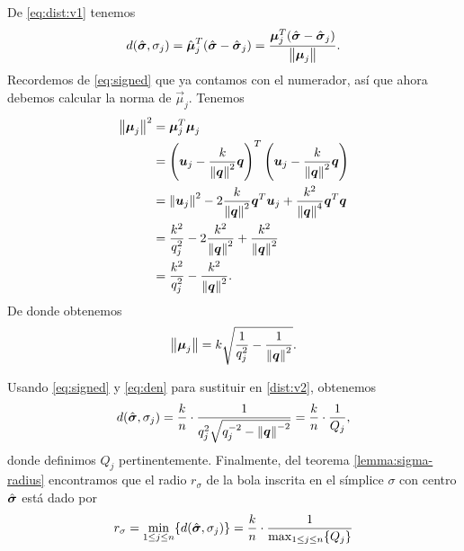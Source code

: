 De \eqref{eq:dist:v1} tenemos
\begin{equation}
	\label{dist:v2}
	d(\hat{\boldsymbol{ \sigma }}, \sigma_j) = \hat{\boldsymbol{\mu}}_j^T(\hat{\boldsymbol{ \sigma }} - \hat{\boldsymbol{ \sigma }}_j)
	= \frac{\boldsymbol{\mu}_j^T(\hat{\boldsymbol{ \sigma }} - \hat{\boldsymbol{ \sigma }}_j)}{\left\lVert \boldsymbol{\mu}_j \right\rVert}.
\end{equation}
Recordemos de \eqref{eq:signed} que ya contamos con el numerador, así que ahora debemos calcular la
norma de $\vec{\mu}_j$. Tenemos
\begin{align*}
	\left\lVert \boldsymbol{\mu}_j \right\rVert^2
	&= \boldsymbol{\mu}_j^T\boldsymbol{\mu}_j \\
	&=
	\left(\boldsymbol{u}_j - \frac{k}{\left\lVert \boldsymbol{q} \right\rVert^2}\boldsymbol{q}\right)^T
	\left(\boldsymbol{u}_j - \frac{k}{\left\lVert \boldsymbol{q} \right\rVert^2}\boldsymbol{q}\right) \\
	&=
	\left\lVert \boldsymbol{u}_j \right\rVert^2 - 2\frac{k}{\left\lVert \boldsymbol{q} \right\rVert^2}\boldsymbol{q}^T\boldsymbol{u}_j +
	\frac{k^2}{\left\lVert \boldsymbol{q} \right\rVert^4}\boldsymbol{q}^T\boldsymbol{q} \\
	&= \frac{k^2}{q_j^2} - 2\frac{k^2}{\left\lVert \boldsymbol{q} \right\rVert^2} + \frac{k^2}{\left\lVert \boldsymbol{q} \right\rVert^2} \\
	&= \frac{k^2}{q_j^2} - \frac{k^2}{\left\lVert \boldsymbol{q} \right\rVert^2}.
\end{align*}
De donde obtenemos
\begin{equation}
	\label{eq:den}
	\left\lVert \boldsymbol{\mu}_j \right\rVert = k\sqrt{\frac{1}{q_j^2} - \frac{1}{\left\lVert \boldsymbol{q} \right\rVert^2}}.
\end{equation}

Usando \eqref{eq:signed} y \eqref{eq:den} para sustituir en \eqref{dist:v2}, obtenemos
\begin{equation*}
	d(\hat{\boldsymbol{ \sigma }}, \sigma_j) = \frac{k}{n} \cdot
	\frac{1}{q_j^2\sqrt{q_j^{-2} - \left\lVert \boldsymbol{q} \right\rVert^{-2}}}
	= \frac{k}{n} \cdot \frac{1}{Q_j},
\end{equation*}
donde definimos $Q_j$ pertinentemente. Finalmente, del teorema \ref{lemma:sigma-radius} encontramos que
el radio $r_\sigma$ de la bola inscrita en el símplice $\sigma$ con centro
$\hat{\boldsymbol{ \sigma }}$ está dado por
\begin{equation}
	\label{eq:sigma-radius}
	r_\sigma = \min_{1 \leq j \leq n} \lbrace d(\hat{\boldsymbol{ \sigma }}, \sigma_j) \rbrace = \frac{k}{n} \cdot
	\frac{1}{\max_{1 \leq j \leq n} \lbrace Q_j \rbrace}
\end{equation}

